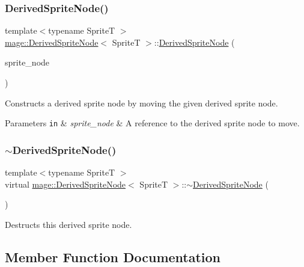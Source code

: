 \subsubsection{\texorpdfstring{Derived\+Sprite\+Node()}{DerivedSpriteNode()}\hspace{0.1cm}{\footnotesize\ttfamily [4/4]}}
{\footnotesize\ttfamily template$<$typename SpriteT $>$ \\
\hyperlink{classmage_1_1_derived_sprite_node}{mage\+::\+Derived\+Sprite\+Node}$<$ SpriteT $>$\+::\hyperlink{classmage_1_1_derived_sprite_node}{Derived\+Sprite\+Node} (\begin{DoxyParamCaption}\item[{\hyperlink{classmage_1_1_derived_sprite_node}{Derived\+Sprite\+Node}$<$ SpriteT $>$ \&\&}]{sprite\+\_\+node }\end{DoxyParamCaption})}

Constructs a derived sprite node by moving the given derived sprite node.


\begin{DoxyParams}[1]{Parameters}
\mbox{\tt in}  & {\em sprite\+\_\+node} & A reference to the derived sprite node to move. \\
\hline
\end{DoxyParams}
\hypertarget{classmage_1_1_derived_sprite_node_a0ff9a3b661a72ae3d200dfe50dc311fc}{}\label{classmage_1_1_derived_sprite_node_a0ff9a3b661a72ae3d200dfe50dc311fc} 
\subsubsection{\texorpdfstring{$\sim$\+Derived\+Sprite\+Node()}{~DerivedSpriteNode()}}
{\footnotesize\ttfamily template$<$typename SpriteT $>$ \\
virtual \hyperlink{classmage_1_1_derived_sprite_node}{mage\+::\+Derived\+Sprite\+Node}$<$ SpriteT $>$\+::$\sim$\hyperlink{classmage_1_1_derived_sprite_node}{Derived\+Sprite\+Node} (\begin{DoxyParamCaption}{ }\end{DoxyParamCaption})\hspace{0.3cm}{\ttfamily [virtual]}}

Destructs this derived sprite node. 

\subsection{Member Function Documentation}
\hypertarget{classmage_1_1_derived_sprite_node_a3a409447de581b0ed39625a9d3beab33}{}\label{classmage_1_1_derived_sprite_node_a3a409447de581b0ed39625a9d3beab33} 
